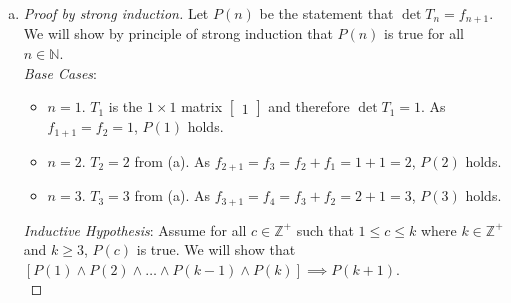 \documentclass[11pt]{scrartcl}
\theoremstyle{dotlessP}
\theoremstyle{dotlessN}
\newcommand{\ints}{\mathbb{Z}}
\newcommand{\nats}{\mathbb{N}}
\begin{document}
\begin{enumerate}[(a)]
\begin{align*}
{\begin{vmatrix}
	1 & i \\
	i & 1
\end{vmatrix} - 
i 
\begin{vmatrix}
	0 & i \\
	0 & 1
\end{vmatrix}
					 } \\
\det T_4					 &= \det T_3 - i^2 \det T_2 = \det T_3 + \det T_2 = 3 + 2 = 5 
		\end{align*}
		From this, we form the following claim: 
		\begin{proposition*}
			If $T_n$ is the  $n \times n$ matrix given by 
	\[
	T_n = 
	\begin{bmatrix}[cccccc]
		1 & i & 0 & 0 & \dots & 0 \\
		i & 1 & i & 0 & \dots & 0 \\
		0 & i & 1 & i & \dots & 0 \\
		\vdots & & \ddots & & & \vdots \\
		0 & \dots & 0 & i & 1 & i \\
		0 & \dots & \dots & 0 & i & 1

	\end{bmatrix}
	\] 
	then for all $n \in \nats$, $\det T_n = f_{n+1}$. where $f_n$ is the $n$-th term of the fibonnaci sequence given by the recursive relation:
\[
	f_n = f_{n-1} + f_{n-2}, f_1 = 1, f_2 = 1
\] 
		\end{proposition*}
	\item 
		\begin{proof}
			[Proof by strong induction] Let $P(n)$ be the statement that $\det T_n = f_{n+1}$. We will show by principle of strong induction that $P(n)$ is true for all $n \in \nats$.
			\\

			\textit{Base Cases}: 
\begin{itemize}
	\item $n = 1$. $T_1$ is the $1 \times 1$ matrix $
\begin{bmatrix}
	1
\end{bmatrix}
$ and therefore $\det T_1 = 1$. As $f_{1+1} = f_2 = 1$, $P(1)$ holds.
\item  $n = 2$. $T_2 = 2$ from (a). As $f_{2 + 1} = f_3 = f_2 + f_1 = 1 + 1 = 2$, $P(2)$ holds.
\item $n = 3$. $T_3 = 3$ from (a). As $f_{3+1} = f_4 = f_3 + f_2 = 2 + 1 = 3$, $P(3)$ holds.
\end{itemize}

\textit{Inductive Hypothesis}: Assume for all $c \in \ints^+$ such that  $1 \leq c \leq k$ where  $k \in \ints^+$ and  $k \geq 3$, $P(c)$ is true. We will show that $[P(1) \land P(2) \land \dots \land P(k-1) \land P(k)] \implies P(k+1)$.
			\\


\end{proof}
\end{enumerate}
\end{document}
